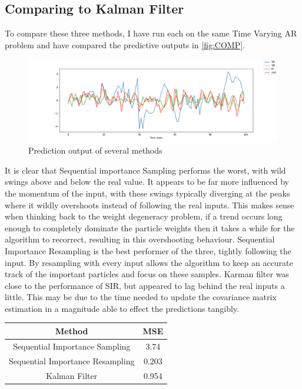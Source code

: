 \documentclass[sigconf]{acmart}
\begin{document}
\subsection{Comparing to Kalman Filter}
To compare these three methods, I have run each on the same Time Varying AR problem and have compared the predictive outputs in \autoref{fig:COMP}.
\begin{figure}[h]
  \centering
  \includegraphics[width=\linewidth]{../Part 1/COMP.png}
  \caption{Prediction output of several methods}
  \label{fig:COMP}
\end{figure}
It is clear that Sequential importance Sampling performs the worst, with wild swings above and below the real value. It appears to be far more influenced by the momentum of the input, with these swings typically diverging at the peaks where it wildly overshoots instead of following the real inputs. This makes sense when thinking back to the weight degeneracy problem, if a trend occurs long enough to completely dominate the particle weights then it takes a while for the algorithm to recorrect, resulting in this overshooting behaviour.
Sequential Importance Resampling is the best performer of the three, tightly following the input. By resampling with every input allows the algorithm to keep an accurate track of the important particles and focus on these samples.
Karman filter was close to the performance of SIR, but appeared to lag behind the real inputs a little. This may be due to the time needed to update the covariance matrix estimation in a magnitude able to effect the predictions tangibly.

\begin{center}
  \begin{tabular}{||c c||} 
    \hline
    Method & MSE \\ [0.5ex] 
    \hline\hline
    Sequential Importance Sampling & 3.74 \\ 
    \hline
    Sequential Importance Resampling & 0.203 \\
    \hline
    Kalman Filter & 0.954 \\ [1ex] 
    \hline
  \end{tabular}
  \label{table:MSE}
\end{center}
\end{document}
